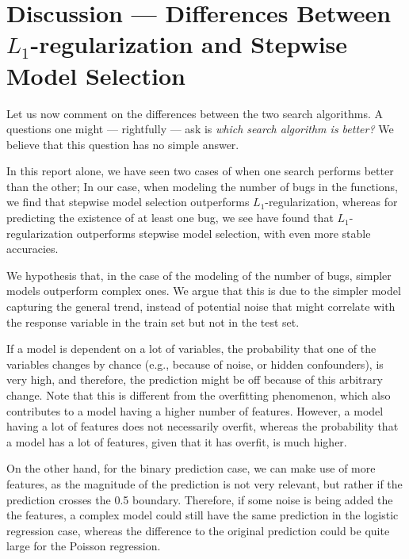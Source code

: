 \section{Discussion --- Differences Between $L_1$-regularization and Stepwise Model Selection}

\label{sec:discussion:differences}

Let us now comment on the differences between the two search algorithms.
A questions one might --- rightfully --- ask is \textit{which search algorithm is better?}
We believe that this question has no simple answer.

In this report alone, we have seen two cases of when one search performs better than the other; In our case, when modeling the number of bugs in the functions, we find that stepwise model selection outperforms $L_1$-regularization, whereas for predicting the existence of at least one bug, we see have found that $L_1$-regularization outperforms stepwise model selection, with even more stable accuracies.

We hypothesis that, in the case of the modeling of the number of bugs, simpler models outperform complex ones. We argue that this is due to the simpler model capturing the general trend, instead of potential noise that might correlate with the response variable in the train set but not in the test set.

If a model is dependent on a lot of variables, the probability that one of the variables changes by chance (e.g., because of noise, or hidden confounders), is very high, and therefore, the prediction might be off because of this arbitrary change.
Note that this is different from the overfitting phenomenon, which also contributes to a model having a higher number of features. However, a model having a lot of features does not necessarily overfit, whereas the probability that a model has a lot of features, given that it has overfit, is much higher.

On the other hand, for the binary prediction case, we can make use of more features, as the magnitude of the prediction is not very relevant, but rather if the prediction crosses the 0.5 boundary.
Therefore, if some noise is being added the the features, a complex model could still have the same prediction in the logistic regression case, whereas the difference to the original prediction could be quite large for the Poisson regression.

